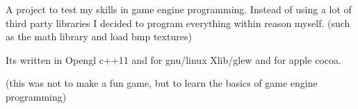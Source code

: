 A project to test my skills in game engine programming. Instead of using a lot of third party libraries I decided to program everything within reason myself. (such as the math library and load bmp textures)

It\textquotesingle{}s written in Opengl c++11 and for gnu/linux Xlib/glew and for apple cocoa.

(this was not to make a fun game, but to learn the basics of game engine programming) 